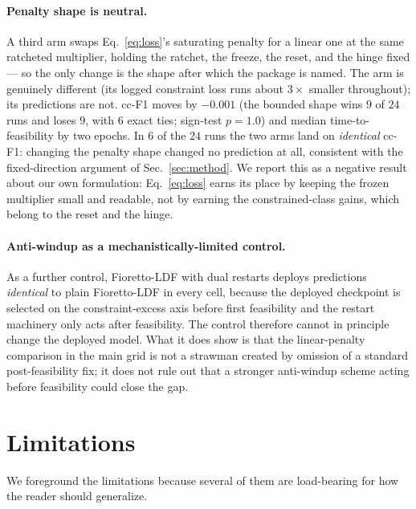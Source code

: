 \documentclass[10pt]{article}
\begin{document}
\paragraph{Penalty shape is neutral.}
A third arm swaps Eq.~\eqref{eq:loss}'s saturating penalty for a linear
one at the same ratcheted multiplier, holding the ratchet, the freeze,
the reset, and the hinge fixed --- so the only change is the shape after
which the package is named. The arm is genuinely different (its logged
constraint loss runs about $3\times$ smaller throughout); its
predictions are not. cc-F1 moves by $-0.001$ (the bounded shape wins $9$
of $24$ runs and loses $9$, with $6$ exact ties; sign-test $p{=}1.0$)
and median time-to-feasibility by two epochs. In $6$ of the $24$ runs the
two arms land on \emph{identical} cc-F1: changing the penalty shape
changed no prediction at all, consistent with the fixed-direction
argument of Sec.~\ref{sec:method}. We report this as a negative result
about our own formulation: Eq.~\eqref{eq:loss} earns its place by keeping
the frozen multiplier small and readable, not by earning the
constrained-class gains, which belong to the reset and the hinge.

\paragraph{Anti-windup as a mechanistically-limited control.}
As a further control, Fioretto-LDF with dual restarts
\citep{gallego2022controlled} deploys predictions \emph{identical} to
plain Fioretto-LDF in every cell, because the deployed checkpoint is
selected on the constraint-excess axis before first feasibility and the
restart machinery only acts after feasibility. The control therefore
cannot in principle change the deployed model. What it does show is that
the linear-penalty comparison in the main grid is not a strawman created
by omission of a standard post-feasibility fix; it does not rule out
that a stronger anti-windup scheme acting before feasibility could close
the gap.

\section{Limitations}
\label{sec:limits}

We foreground the limitations because several of them are load-bearing for
how the reader should generalize.
\end{document}

